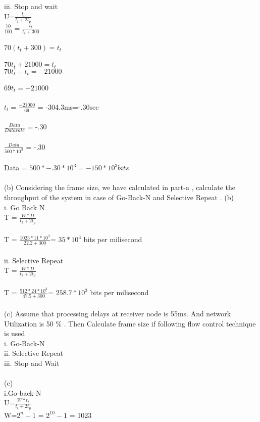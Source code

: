\documentclass[a4paper,12pt]{article}
\begin{document}
iii. Stop and wait\\
U=$\frac{t_{t}}{t_{t}+2t_{p}}$\\
$\frac{70}{100} = \frac{t_{t}}{t_{t}+300}$\\\\
$70(t_{t}+300)=t_{t}$\\\\
$70t_{t} + 21000 = t_{t}$\\
$70t_{t}-t_{t} = -21000$\\\\
$69t_{t}=-21000$\\\\
$t_{t} = \frac{-21000}{69}$ = -304.3ms=-.30sec\\\\
$\frac{Data}{Datarate}$ = -.30\\\\
$\frac{Data}{500*10^3}$ = -.30\\\\
Data = $500* -.30*10^3= -150 * 10^3 bits$\\\\
(b) Considering the frame size, we have calculated in part-a , calculate the throughput
of the system in case of Go-Back-N and Selective Repeat .
(b) \\
i. Go Back N\\
T = $\frac{W*D}{t_{t}+2t_{p}}$\\\\
T = $\frac{1023*11*10^3}{22.2+300}$= $35*10^3$ bits per milisecond\\\\
ii. Selective Repeat\\
T = $\frac{W*D}{t_{t}+2t_{p}}$\\\\
T = $\frac{512*24*10^3}{47.5+300}$= $258.7*10^3$ bits per milisecond\\\\
(c) Assume that processing delays at receiver node is 55ms. And network Utilization is
50 \% . Then Calculate frame size if following
flow control technique is used\\
i. Go-Back-N\\
ii. Selective Repeat\\
iii. Stop and Wait\\\\
(c)\\
i.Go-back-N\\
U=$\frac{W*t_{t}}{t_{t}+2t_{p}}$\\
W=$2^n-{1}$ = $2^{10}-1$ = 1023\\\\
\end{document}
